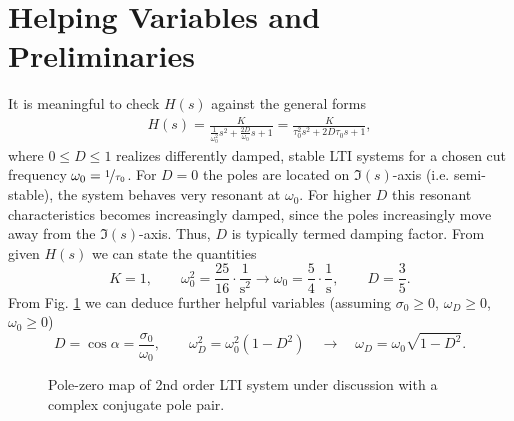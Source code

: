 \documentclass[a4paper,11pt,oneside]{scrartcl}
\begin{document}
\section{Helping Variables and Preliminaries}
It is meaningful to check $H(s)$ against the general forms
\begin{align}
\label{eq:Hs_general}
H(s) = \frac{K}{\frac{1}{\omega_0^2} s^2 + \frac{2 D}{\omega_0} s + 1}
= \frac{K}{\tau_0^2 s^2 + 2 D \tau_0 s + 1},
\end{align}
where $0\leq D \leq 1$ realizes differently damped, stable LTI systems for a
chosen cut frequency $\omega_0=\nicefrac{1}{\tau_0}$.
%
For $D=0$ the poles are located on $\Im(s)$-axis (i.e. semi-stable),
the system behaves very resonant at $\omega_0$.
For higher $D$ this resonant characteristics becomes increasingly
damped, since the poles increasingly move away from the $\Im(s)$-axis.
%
Thus, $D$ is typically termed damping factor.
%
From given $H(s)$ we can state the quantities
\begin{equation}
K=1, \qquad \omega_0^2 = \frac{25}{16} \cdot \frac{1}{\text{s}^2}
\rightarrow \omega_0 = \frac{5}{4} \cdot \frac{\text{1}}{\text{s}},
\qquad D = \frac{3}{5}.
\end{equation}
%
From Fig. \ref{fig:sketch_lambda_plane} we can deduce further helpful variables
(assuming $\sigma_0\geq 0$, $\omega_D\geq 0$, $\omega_0\geq 0$)
\begin{equation}
D = \cos \alpha = \frac{\sigma_0}{\omega_0},\qquad
\omega_D^2 = \omega_0^2 (1-D^2) \quad \rightarrow \quad \omega_D = \omega_0
\sqrt{1-D^2}.
\end{equation}
%
\begin{figure}[b!]
\centering
{}
\caption{Pole-zero map of 2nd order LTI system under discussion with a complex
conjugate pole pair.}
\label{fig:sketch_lambda_plane}
\end{figure}
\end{document}

